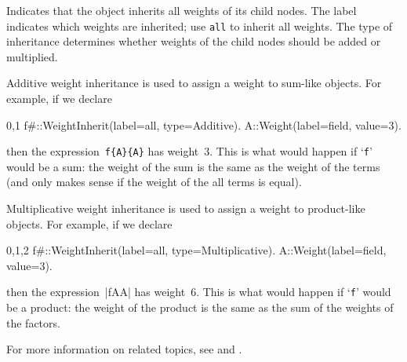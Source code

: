 
Indicates that the object inherits all weights of its child nodes. The
label indicates which weights are inherited; use {\tt all} to inherit
all weights. The type of inheritance determines whether weights of the
child nodes should be added or multiplied. 

Additive weight inheritance is used to assign a weight to sum-like
objects. For example, if we declare
\begin{screen}{0,1}
f{#}::WeightInherit(label=all, type=Additive).
A::Weight(label=field, value=3).
\end{screen}
then the expression~\verb|f{A}{A}| has weight~3. This is what would
happen if `\verb|f|' would be a sum: the weight of the sum is the same
as the weight of the terms (and only makes sense if the weight of the
all terms is equal).

Multiplicative weight inheritance is used to assign a weight to 
product-like objects. For example, if we declare
\begin{screen}{0,1,2}
f{#}::WeightInherit(label=all, type=Multiplicative).
A::Weight(label=field, value=3).
\end{screen}
then the expression~\verbf|f{A}{A}| has weight~6. This is what would
happen if `\verb|f|' would be a product: the weight of the product is the same
as the sum of the weights of the factors.

For more information on related topics, see 
and .



